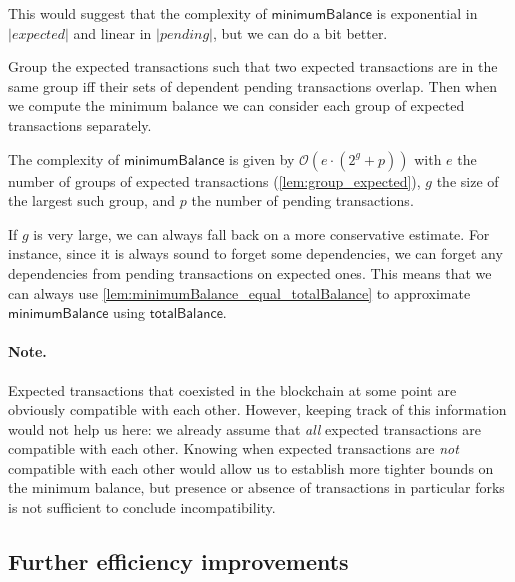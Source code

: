 \documentclass{article}
\newcommand{\order}[1]{\mathcal{O}\left(#1\right)}
\theoremstyle{definition}{
  \newtheorem{lemma}{Lemma}[section] %
  \newtheorem{definition}[lemma]{Definition}
}
\theoremstyle{theorem}{
  \newtheorem{invariant}[lemma]{Invariant}
  \newtheorem{proofobligation}[lemma]{Proof Obligation}
}
\numberwithin{equation}{lemma}
\begin{document}
This would suggest that the complexity of $\mathsf{minimumBalance}$ is
exponential in $|\mathit{expected}|$ and linear in $|\mathit{pending}|$,
but we can do a bit better.

\begin{lemma}
Group the expected transactions such that two expected transactions are in
the same group iff their sets of dependent pending transactions overlap.
Then when we compute the minimum balance we can consider each group of
expected transactions separately.
\label{lem:group_expected}
\end{lemma}

\begin{lemma}
The complexity of $\mathsf{minimumBalance}$ is given by
\begin{math}
\order{e \cdot (2^g + p)}
\end{math}
with $e$ the number of groups of expected transactions
(\cref{lem:group_expected}), $g$ the size of the largest such group,
and $p$ the number of pending transactions.
\label{lem:complexity_minimize}
\end{lemma}

If $g$ is very large, we can always fall back on a more conservative estimate.
For instance, since it is always sound to forget some dependencies, we can
forget any dependencies from pending transactions on expected ones. This means
that we can always use \cref{lem:minimumBalance_equal_totalBalance} to
approximate $\mathsf{minimumBalance}$ using $\mathsf{totalBalance}$.

\paragraph{Note.}
Expected transactions that coexisted in the blockchain at some point are
obviously compatible with each other. However, keeping track of this information
would not help us here: we already assume that \emph{all} expected transactions
are compatible with each other. Knowing when expected transactions are
\emph{not} compatible with each other would allow us to establish more tighter
bounds on the minimum balance, but presence or absence of transactions in
particular forks is not sufficient to conclude incompatibility.

\subsection{Further efficiency improvements}
\end{document}
